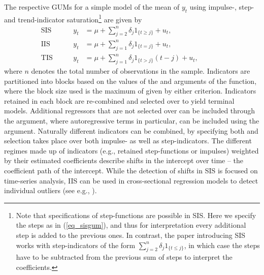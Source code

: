 \documentclass[article,nojss]{jss}
\begin{document}
The respective GUMs for a simple model of the mean of $y_t$ using
impulse-, step- and trend-indicator saturation\footnote{Note that
  specifications of step-functions are possible in SIS. Here we
  specify the steps as in (\ref{eq_sisgum}), and thus for
  interpretation every additional step is added to the previous
  ones. In contrast, the paper introducing SIS
  \citep{castle2015detecting} works with step-indicators of the form
  $\sum^{n}_{j=2} \delta_j 1_{\{ t \leq j \}}$, in which case the
  steps have to be subtracted from the previous sum of steps to
  interpret the coefficients.} are given by
%
\begin{align} 
\label{eq_sisgum}
\qquad\qquad&\mbox{SIS GUM: }& y_t &= \mu + \sum^{n}_{j=2} \delta_j 1_{\{ t \geq j  \} } + u_t,\qquad\qquad\qquad\qquad\qquad\qquad\\
\label{eq_iisgum}
\qquad\qquad&\mbox{IIS GUM: }& y_t &= \mu + \sum^{n}_{j=1} \delta_j 1_{\{ t = j  \} } + u_t,\\
\label{eq_tisgum}
\qquad\qquad&\mbox{TIS GUM: }& y_t &= \mu + \sum^{n}_{j=1} \delta_j 1_{\{ t > j  \} }(t-j) + u_t,
\end{align}
%
where $n$ denotes the total number of observations in the
sample. Indicators are partitioned into blocks based on the values of
the  and  arguments of the
 function, where the block size used is the maximum of
given by either criterion. Indicators retained in each block are
re-combined and selected over to yield terminal models. Additional
regressors that are not selected over can be included through the
 argument, where autoregressive terms in particular, can
be included using the  argument. Naturally different
indicators can be combined, by specifying both  and
 selection takes place over both impulse- as well as
step-indicators. The different regimes made up of indicators (e.g.,
retained step-functions or impulses) weighted by their estimated
coefficients describe shifts in the intercept over time -- the
coefficient path of the intercept. While the detection of shifts in
SIS is focused on time-series analysis, IIS can be used in
cross-sectional regression models to detect individual outliers (see
e.g., \citealt{pretis2017gauge}).
\end{document}
